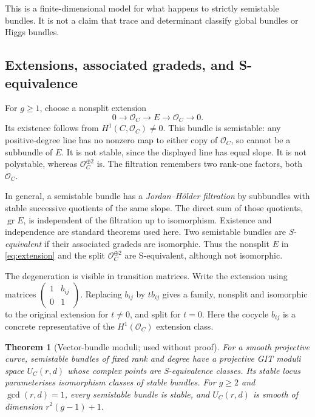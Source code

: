 \documentclass[11pt,a4paper]{article}
\numberwithin{equation}{section}
\newtheorem{theorem}[definition]{Theorem}
\theoremstyle{definition}
\newcommand{\OO}{\mathcal O}
\newcommand{\gr}{\operatorname{gr}}
\begin{document}
This is a finite-dimensional model for what happens to strictly
semistable bundles. It is not a claim that trace and determinant classify
global bundles or Higgs bundles.

\subsection{Extensions, associated gradeds, and S-equivalence}
For $g\ge1$, choose a nonsplit extension
\begin{equation}\label{eq:extension}
 0\to\OO_C\to E\to\OO_C\to0.
\end{equation}
Its existence follows from $H^1(C,\OO_C)\ne0$. This bundle is semistable:
any positive-degree line has no nonzero map to either copy of $\OO_C$,
so cannot be a subbundle of $E$. It is not stable, since the displayed
line has equal slope. It is not polystable, whereas $\OO_C^{\oplus2}$ is.
The filtration remembers two rank-one factors, both $\OO_C$.

In general, a semistable bundle has a \emph{Jordan--Hölder filtration}
by subbundles with stable successive quotients of the same slope.
The direct sum of those quotients, $\gr E$, is independent of the
filtration up to isomorphism. Existence and independence are standard
theorems used here. Two semistable bundles are \emph{S-equivalent} if
their associated gradeds are isomorphic. Thus the nonsplit $E$ in
\eqref{eq:extension} and the split $\OO_C^{\oplus2}$ are S-equivalent,
although not isomorphic.

The degeneration is visible in transition matrices. Write the extension
using matrices $\left(\begin{smallmatrix}1&b_{ij}\\0&1\end{smallmatrix}\right)$.
Replacing $b_{ij}$ by $t b_{ij}$ gives a family, nonsplit and isomorphic
to the original extension for $t\ne0$, and split for $t=0$.
Here the cocycle $b_{ij}$ is a concrete representative of the
$H^1(\OO_C)$ extension class.

\begin{theorem}[Vector-bundle moduli; used without proof]
For a smooth projective curve, semistable bundles of fixed rank and
degree have a projective GIT moduli space $U_C(r,d)$ whose complex points
are S-equivalence classes. Its stable locus parameterises isomorphism
classes of stable bundles. For $g\ge2$ and $\gcd(r,d)=1$, every
semistable bundle is stable, and $U_C(r,d)$ is smooth of dimension
$r^2(g-1)+1$.
\end{theorem}
\end{document}
